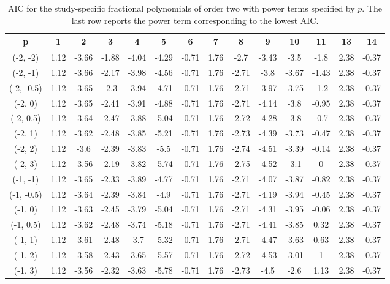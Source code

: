 \documentclass[11pt,a4paper,twoside,openany]{book}\usepackage{knitr}
\begin{document}
{\begin{knitrout}
\begin{table}
\caption{\label{tab:AIC_pi_red}AIC for the study-specific fractional polynomials of order two with power terms specified by $p$. The last row reports the power term corresponding to the lowest AIC.
}
\centering
\fontsize{8}{10}\selectfont
\begin{tabular}[t]{cccccccccccccc}
\toprule
p & 1 & 2 & 3 & 4 & 5 & 6 & 7 & 8 & 9 & 10 & 11 & 13 & 14\\
\midrule
(-2, -2) & 1.12 & -3.66 & -1.88 & -4.04 & -4.29 & -0.71 & 1.76 & -2.7 & -3.43 & -3.5 & -1.8 & 2.38 & -0.37\\
(-2, -1) & 1.12 & -3.66 & -2.17 & -3.98 & -4.56 & -0.71 & 1.76 & -2.71 & -3.8 & -3.67 & -1.43 & 2.38 & -0.37\\
(-2, -0.5) & 1.12 & -3.65 & -2.3 & -3.94 & -4.71 & -0.71 & 1.76 & -2.71 & -3.97 & -3.75 & -1.2 & 2.38 & -0.37\\
(-2, 0) & 1.12 & -3.65 & -2.41 & -3.91 & -4.88 & -0.71 & 1.76 & -2.71 & -4.14 & -3.8 & -0.95 & 2.38 & -0.37\\
(-2, 0.5) & 1.12 & -3.64 & -2.47 & -3.88 & -5.04 & -0.71 & 1.76 & -2.72 & -4.28 & -3.8 & -0.7 & 2.38 & -0.37\\
\addlinespace
(-2, 1) & 1.12 & -3.62 & -2.48 & -3.85 & -5.21 & -0.71 & 1.76 & -2.73 & -4.39 & -3.73 & -0.47 & 2.38 & -0.37\\
(-2, 2) & 1.12 & -3.6 & -2.39 & -3.83 & -5.5 & -0.71 & 1.76 & -2.74 & -4.51 & -3.39 & -0.14 & 2.38 & -0.37\\
(-2, 3) & 1.12 & -3.56 & -2.19 & -3.82 & -5.74 & -0.71 & 1.76 & -2.75 & -4.52 & -3.1 & 0 & 2.38 & -0.37\\
(-1, -1) & 1.12 & -3.65 & -2.33 & -3.89 & -4.77 & -0.71 & 1.76 & -2.71 & -4.07 & -3.87 & -0.82 & 2.38 & -0.37\\
(-1, -0.5) & 1.12 & -3.64 & -2.39 & -3.84 & -4.9 & -0.71 & 1.76 & -2.71 & -4.19 & -3.94 & -0.45 & 2.38 & -0.37\\
\addlinespace
(-1, 0) & 1.12 & -3.63 & -2.45 & -3.79 & -5.04 & -0.71 & 1.76 & -2.71 & -4.31 & -3.95 & -0.06 & 2.38 & -0.37\\
(-1, 0.5) & 1.12 & -3.62 & -2.48 & -3.74 & -5.18 & -0.71 & 1.76 & -2.71 & -4.41 & -3.85 & 0.32 & 2.38 & -0.37\\
(-1, 1) & 1.12 & -3.61 & -2.48 & -3.7 & -5.32 & -0.71 & 1.76 & -2.71 & -4.47 & -3.63 & 0.63 & 2.38 & -0.37\\
(-1, 2) & 1.12 & -3.58 & -2.43 & -3.65 & -5.57 & -0.71 & 1.76 & -2.72 & -4.53 & -3.01 & 1 & 2.38 & -0.37\\
(-1, 3) & 1.12 & -3.56 & -2.32 & -3.63 & -5.78 & -0.71 & 1.76 & -2.73 & -4.5 & -2.6 & 1.13 & 2.38 & -0.37\\

\end{tabular}
\end{table}
\end{knitrout}}
\end{document}
